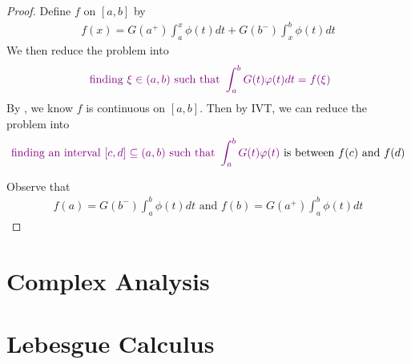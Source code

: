 \documentclass{report}
\begin{document}
\begin{proof}
Define $f$ on  $[a,b]$ by 
\begin{align*}
f(x)=G(a^+)\int_a^x \phi(t)dt+G(b^-)\int_x^b \phi(t)dt
\end{align*}
We then reduce the problem into 
\begin{align*}
\textcolor{violet}{\text{ finding }\xi \in (a,b)\text{ such that }\int_a^b G(t)\varphi (t)dt=f(\xi)}
\end{align*}
By , we know $f$ is continuous on  $[a,b]$. Then by IVT, we can reduce the problem into 
\begin{align*}
\textcolor{violet}{\text{ finding an interval $[c,d]\subseteq (a,b)$ such that }\int_a^b G(t)\varphi (t)}\text{ is between $f(c) $ and $f(d)$ }
\end{align*}


Observe that 
\begin{align*}
f(a)=G(b^-)\int_a^b \phi(t)dt\text{ and }f(b)=G(a^+)\int_a^b \phi(t)dt 
\end{align*}




\end{proof} 


\chapter{Complex Analysis}
\chapter{Lebesgue Calculus}
\end{document}
